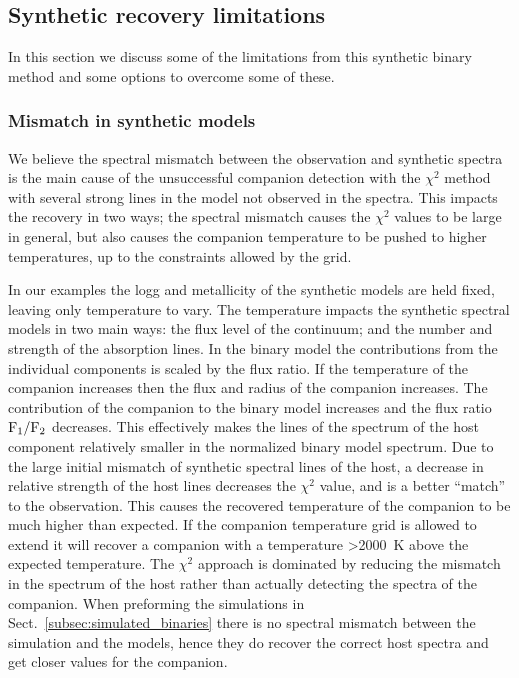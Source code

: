\documentclass[fleqn,usenatbib]{mnras}
\begin{document}
\subsection{Synthetic recovery limitations}
\label{subsec:limitations}
In this section we discuss some of the limitations from this synthetic binary method and some options to overcome some of these.

\subsubsection{Mismatch in synthetic models}
\label{subsubsec:mismatch}
We believe the spectral mismatch between the observation and synthetic spectra is the main cause of the unsuccessful companion detection with the $\chi^2$ method with several strong lines in the model not observed in the spectra. This impacts the recovery in two ways; the spectral mismatch causes the \(\chi^2\) values to be large in general, but also causes the companion temperature to be pushed to higher temperatures, up to the constraints allowed by the grid.

In our examples the logg and metallicity of the synthetic models are held fixed, leaving only temperature to vary. The temperature impacts the synthetic spectral models in two main ways: the flux level of the continuum; and the number and strength of the absorption lines. In the binary model the contributions from the individual components is scaled by the flux ratio. If the temperature of the companion increases then the flux and radius of the companion increases. The contribution of the companion to the binary model increases and the flux ratio \(\rm F_1/F_2\) decreases. This effectively makes the lines of the spectrum of the host component relatively smaller in the normalized binary model spectrum. Due to the large initial mismatch of synthetic spectral lines of the host, a decrease in relative strength of the host lines decreases the \(\chi^2\) value, and is a better ``match'' to the observation. This causes the recovered temperature of the companion to be much higher than expected. If the companion temperature grid is allowed to extend it will recover a companion with a temperature >2000~K above the expected temperature. The \(\chi^2\) approach is dominated by reducing the mismatch in the spectrum of the host rather than actually detecting the spectra of the companion. When preforming the simulations in Sect.~\ref{subsec:simulated_binaries} there is no spectral mismatch between the simulation and the models, hence they do recover the correct host spectra and get closer values for the companion.
\end{document}
